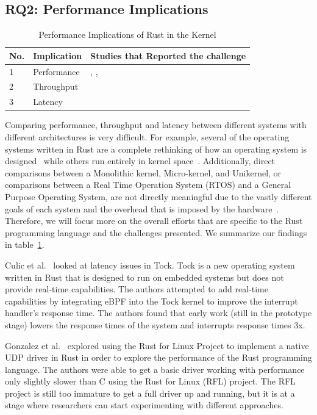 \documentclass[sigconf]{acmart}
\begin{document}
\subsection{RQ2: Performance Implications}

\begin{table}
    \caption{Performance Implications of Rust in the Kernel}
    \begin{tabular}{||l|l|l||}
    \hline
    No. & Implication & Studies that Reported the challenge\\
    \hline\hline
    1 & Performance & \cite{Gonzalez2023-ek}, \cite{Li2024-be}, \cite{Ma2023-ef}\\
    2 & Throughput & \cite{Gonzalez2023-ek}\\
    3 & Latency & \cite{Culic2022-bk} \\
    \hline
  \end{tabular}
  \label{tab:RQ2}
\end{table}

Comparing performance, throughput and latency between different systems with different architectures is very difficult. For
example, several of the operating systems written in Rust are a complete rethinking of
how an operating system is designed~\cite{Boos2020-zh} while others run entirely in kernel space~\cite{Lankes2019-cm}. Additionally, direct comparisons between a Monolithic kernel, Micro-kernel, and Unikernel, or
comparisons between a Real Time Operation System (RTOS) and a General Purpose Operating System, are
not directly meaningful due to the vastly different goals of each system and the overhead that is imposed by the hardware~\cite{Arnott2012-fl}. Therefore, we will focus more on the overall efforts that are specific to the Rust programming language and the challenges
presented. We summarize our findings in table~\ref{tab:RQ2}.

Culic et al.~\cite{Culic2022-bk} looked at latency issues in Tock. Tock is a new operating
system written in Rust that is designed to run on embedded systems but does not provide real-time capabilities. The
authors attempted to add real-time capabilities by integrating eBPF into the Tock kernel to improve
the interrupt handler's response time. The authors found that early work (still in the prototype
stage) lowers the response times of the system and interrupts response times 3x.

Gonzalez et al.~\cite{Gonzalez2023-ek} explored using the Rust for Linux Project to implement a
native UDP driver in Rust in order to explore the performance of the Rust programming language. The
authors were able to get a basic driver working with performance only slightly slower than C using
the Rust for Linux (RFL) project. The RFL project is still too immature to get a full driver up and
running, but it is at a stage where researchers can start experimenting with different approaches.
\end{document}
